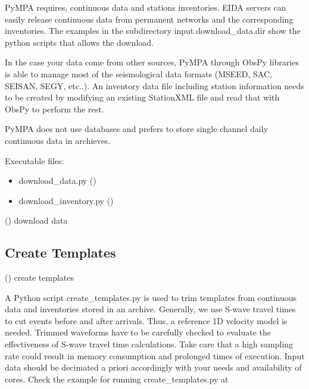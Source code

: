 \documentclass[a4paper,10pt,english]{sphinxmanual}
\begin{document}
PyMPA requires, continuous data and stations inventories.
EIDA servers can easily release continuous data from permanent networks and the corresponding
inventories. The examples in the subdirectory input.download\_data.dir show the python scripts
that allows the download.

In the case your data come from other sources, PyMPA through ObsPy libraries
is able to manage most of the seismological data formats (MSEED, SAC, SEISAN, SEGY, etc..).
An inventory data file including station information needs to be created by modifying an existing
StationXML file and read that with ObsPy to perform the rest.

PyMPA does not use databases and prefers to store single channel daily continuous data in archieves.

Executable files:
\begin{itemize}
\item {} 
download\_data.py ()

\item {} 
download\_inventory.py ()

\end{itemize}

({\hyperref[\detokenize{sub/input.download_data::doc}]{}}) download data


\subsection{Create Templates}
\label{\detokenize{tutorial:create-templates}}
({\hyperref[\detokenize{sub/input.create_templates::doc}]{}}) create templates

A Python script create\_templates.py is used to trim templates from continuous data and inventories
stored in an archive. Generally, we use S-wave travel times to cut events before and after arrivals.
Thus, a reference 1D velocity model is needed. Trimmed waveforms have to be carefully checked to evaluate
the effectiveness of S-wave travel time calculations.
Take care that a high sampling rate could result in memory consumption
and prolonged times of execution.
Input data should be decimated a priori accordingly with your needs and availability of cores.
Check the example for running create\_templates.py at 
\end{document}
